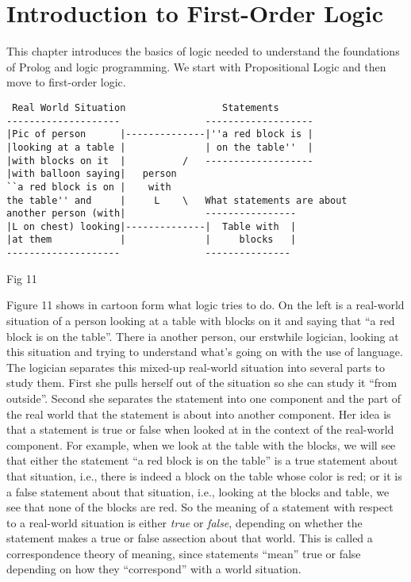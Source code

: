 \chapter{Introduction to First-Order Logic} \label{fol}

This chapter introduces the basics of logic needed to understand the
foundations of Prolog and logic programming.  We start with
Propositional Logic and then move to first-order logic.

\begin{verbatim}
 Real World Situation                 Statements
--------------------               -------------------
|Pic of person      |--------------|''a red block is |
|looking at a table |              | on the table''  |
|with blocks on it  |          /   -------------------
|with balloon saying|   person
``a red block is on |    with
the table'' and     |     L    \   What statements are about
another person (with|              ----------------
|L on chest) looking|--------------|  Table with  |
|at them            |              |     blocks   |
--------------------               ---------------
\end{verbatim}
Fig 11

Figure 11 shows in cartoon form what logic tries to do.  On the left
is a real-world situation of a person looking at a table with blocks
on it and saying that ``a red block is on the table''.  There ia
another person, our erstwhile logician, looking at this situation and
trying to understand what's going on with the use of language.  The
logician separates this mixed-up real-world situation into several
parts to study them.  First she pulls herself out of the situation so
she can study it ``from outside''.  Second she separates the statement
into one component and the part of the real world that the statement
is about into another component.  Her idea is that a statement is true
or false when looked at in the context of the real-world component.
For example, when we look at the table with the blocks, we will see
that either the statement ``a red block is on the table'' is a true
statement about that situation, i.e., there is indeed a block on the
table whose color is red; or it is a false statement about that
situation, i.e., looking at the blocks and table, we see that none of
the blocks are red.  So the meaning of a statement with respect to a
real-world situation is either {\em true} or {\em false}, depending on
whether the statement makes a true or false assection about that
world.  This is called a correspondence theory of meaning, since
statements ``mean'' true or false depending on how they ``correspond''
with a world situation.

